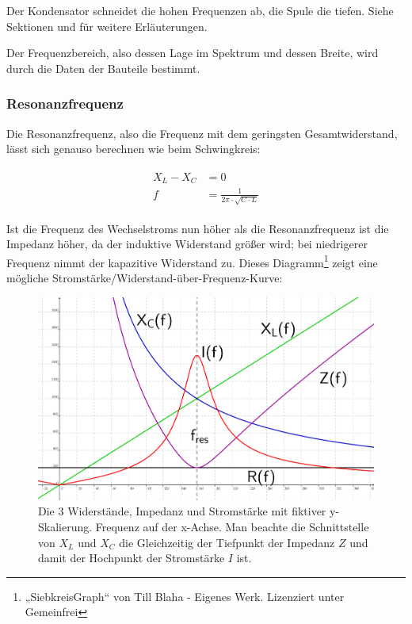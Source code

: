 Der Kondensator \glqq schneidet\grqq{} die hohen Frequenzen \glqq ab\grqq , die Spule die tiefen. Siehe Sektionen  und  für weitere Erläuterungen.

Der Frequenzbereich, also dessen Lage im Spektrum und dessen Breite, wird durch die Daten der Bauteile bestimmt.


\subsubsection{Resonanzfrequenz}

Die Resonanzfrequenz, also die Frequenz mit dem geringsten Gesamtwiderstand, lässt sich genauso berechnen wie beim Schwingkreis:

\begin{align}	\label{eq:ResonanzfrequenzSiebkreis}
\begin{split}
	X_L - X_C &= 0 \\
	f &= \frac{1}{2 \pi \cdot \sqrt{C \cdot L}}
\end{split}
\end{align}

Ist die Frequenz des Wechselstroms nun höher als die Resonanzfrequenz ist die Impedanz höher, da der induktive Widerstand größer wird; bei niedrigerer Frequenz nimmt der kapazitive Widerstand zu. Dieses Diagramm\footnote{„SiebkreisGraph“ von Till Blaha - Eigenes Werk. Lizenziert unter Gemeinfrei} zeigt eine mögliche Stromstärke/Widerstand-über-Frequenz-Kurve:

\begin{figure}[h!]
	\centering
	\includegraphics[width=\textwidth]{Pictures/SiebkreisGraph}
	\caption{Die 3 Widerstände, Impedanz und Stromstärke mit fiktiver y-Skalierung. Frequenz auf der x-Achse. Man beachte die Schnittstelle von $X_L$ und $X_C$ die Gleichzeitig der Tiefpunkt der Impedanz $Z$ und damit der Hochpunkt der Stromstärke $I$ ist.}
\end{figure}




